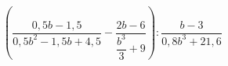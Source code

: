 \begin{ex}[type=expression]
	\begin{condition}
		\( \left( \dfrac{0,5b-1,5}{0,5b^2-1,5b+4,5}-\dfrac{2b-6}{\dfrac{b^3}{3}+9} \right):\dfrac{b-3}{0,8b^3+21,6} \)
	\end{condition}
\end{ex}